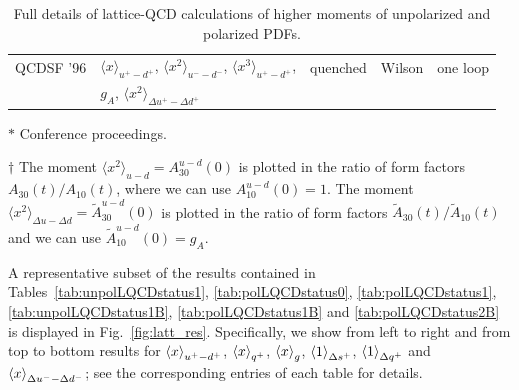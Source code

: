 \begin{table}[!t]
\begin{threeparttable}
\begin{tabular}{lllll}
  QCDSF '96 \cite{Gockeler:1995wg} &
  $\langle x\rangle_{u^+-d^+}$,
  $\langle x^2\rangle_{u^--d^-}$,
  $\langle x^3\rangle_{u^+-d^+}$, &
  quenched & Wilson & one loop \\
  & $g_A$,
  $\langle x^2\rangle_{\Delta u^+-\Delta d^+}$ & & &\\
\bottomrule
\end{tabular}
\begin{tablenotes}
\scriptsize
\item[$*$] Conference proceedings.
\item[$\dagger$] The moment $\langle x^2\rangle_{u-d}=A_{30}^{u-d}(0)$ is plotted 
in the ratio of form factors $A_{30}(t)/A_{10}(t)$, where we can use 
$A_{10}^{u-d}(0)=1$. 
The moment $\langle x^2\rangle_{\Delta u-\Delta d}=\tilde A_{30}^{u-d}(0)$ is plotted 
in the ratio of form factors $\tilde A_{30}(t)/\tilde A_{10}(t)$ and we can use 
$\tilde A_{10}^{u-d}(0)=g_A$.
\end{tablenotes}
\end{threeparttable}
\caption{\small Full details of lattice-QCD calculations of higher moments of 
unpolarized and polarized PDFs.}
\label{tab:latticebiblast}
\end{table}

A representative subset of the results contained in
Tables~\ref{tab:unpolLQCDstatus1}, \ref{tab:polLQCDstatus0},
\ref{tab:polLQCDstatus1}, \ref{tab:unpolLQCDstatus1B},
\ref{tab:polLQCDstatus1B} and \ref{tab:polLQCDstatus2B}
is displayed in Fig.~\ref{fig:latt_res}.
%
Specifically, we show from left to right and from top to bottom
results for $\left\langle x\right\rangle_{u^+-d^+}$, $\left\langle x\right\rangle_{q^+}$, $\left\langle x\right\rangle_{g}$,
$\left\langle 1 \right\rangle_{\Delta s^+}$, $\left\langle 1\right\rangle_{\Delta q^+}$ and
$\left\langle x\right\rangle_{\Delta u^- - \Delta d^-}$;
see the corresponding entries of each table for details.

